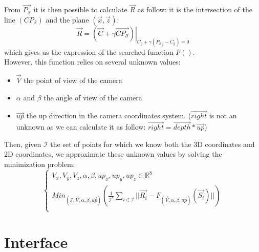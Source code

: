 From $\overrightarrow{P_{\mathcal{S}}}$ it is then possible to calculate $\overrightarrow{R}$ as follow: it is the intersection of the line $(CP_{\mathcal{S}})$ and the plane $(\overrightarrow{x},\overrightarrow{z})$:\\
\begin{equation}
\overrightarrow{R}=\left.(\overrightarrow{C}+\gamma\overrightarrow{CP_{\mathcal{S}}})\right|_{C_y+\gamma ({P_{\mathcal{S}}}_y-C_y)=0}
\end{equation}
which gives us the expression of the searched function $F()$.\\

However, this function relies on several unknown values:\\
\begin{itemize}
\item $\overrightarrow{V}$ the point of view of the camera
\item $\alpha$ and $\beta$ the angle of view of the camera
\item $\overrightarrow{up}$ the up direction in the camera coordinates system. ($\overrightarrow{right}$ is not an unknown as we can calculate it as follow: $\overrightarrow{right}=\overrightarrow{depth}*\overrightarrow{up}$)
\end{itemize}

Then, given $\mathcal{I}$ the set of points for which we know both the 3D coordinates and 2D coordinates, we approximate these unknown values by solving the minimization problem:\\
\begin{equation}
\left\lbrace
\begin{array}{l}
{V_x,V_y,V_z,\alpha,\beta,up_x,up_y,up_z}\in\mathbb{R}^8\\
Min_{(\mathcal{I},\overrightarrow{V},\alpha,\beta,\overrightarrow{up})}(\frac{1}{\mathcal{I}^*}\sum_{i\in\mathcal{I}}||\overrightarrow{R_i}-F_{(\overrightarrow{V},\alpha,\beta,\overrightarrow{up})}(\overrightarrow{S_i})||)\\
\end{array}
\right.
\end{equation}

\section{Interface}

\begin{scriptsize}
\begin{ttfamily}

\end{ttfamily}
\end{scriptsize}

